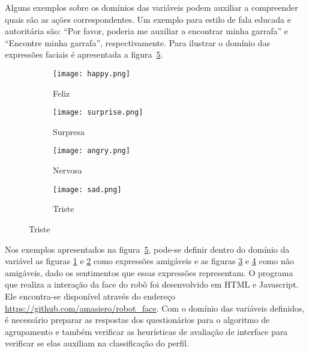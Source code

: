 Alguns exemplos sobre os domínios das variáveis podem auxiliar a compreender quais são as ações correspondentes. Um exemplo para estilo de fala educada e autoritária são: ``Por favor, poderia me auxiliar a encontrar minha garrafa'' e ``Encontre minha garrafa'', respectivamente. Para ilustrar o domínio das expressões faciais é apresentada a figura~\ref{fig:dominioexpressoesfaciais}.

\begin{figure}[ht!]
	\centering
	\begin{minipage}{\textwidth}
		\caption{Visão geral do processo de construção do classificador.}
		\begin{subfigure}[b]{0.48\textwidth}
			\texttt{[image: happy.png]}
	        \caption{Feliz}
	        \label{fig:feliz}
	    \end{subfigure}
	    \hfill
		\begin{subfigure}[b]{0.48\textwidth}
	        \texttt{[image: surprise.png]}
	        \caption{Surpresa}
	        \label{fig:surpresa}
	    \end{subfigure}

		\begin{subfigure}[b]{0.48\textwidth}
	        \texttt{[image: angry.png]}
	        \caption{Nervosa}
	        \label{fig:nervosa}
    	\end{subfigure}
		\hfill
		\begin{subfigure}[b]{0.48\textwidth}
	        \texttt{[image: sad.png]}
	        \caption{Triste}
	        \label{fig:triste}
    	\end{subfigure}
		\label{fig:dominioexpressoesfaciais}
	\end{minipage}
\end{figure}

Nos exemplos apresentados na figura~\ref{fig:dominioexpressoesfaciais}, pode-se definir dentro do domínio da variável as figuras \ref{fig:feliz} e \ref{fig:surpresa} como expressões amigáveis e as figuras \ref{fig:nervosa} e \ref{fig:triste} como não amigáveis, dado os sentimentos que essas expressões representam. O programa que realiza a interação da face do robô foi desenvolvido em HTML e Javascript. Ele encontra-se disponível através do endereço \url{https://github.com/amasiero/robot_face}. Com o domínio das variáveis definidos, é necessário preparar as respostas dos questionários para o algoritmo de agrupamento e também verificar as heurísticas de avaliação de interface para verificar se elas auxiliam na classificação do perfil.

